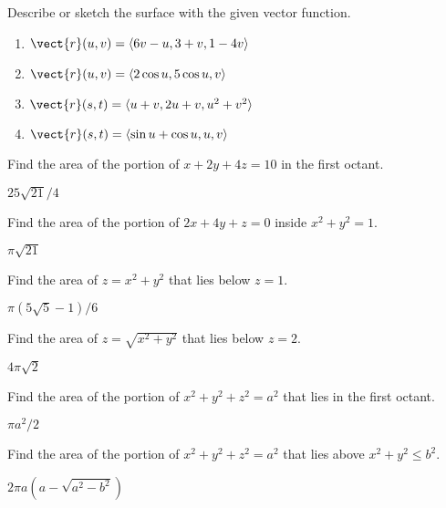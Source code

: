 \begin{enumialphparenastyle}

\begin{ex} \label{exfix3}
Describe or sketch the surface with the given vector function.
\begin{enumerate}
  \item	$\vect{r}(u,v) = \langle 6v-u,3+v,1-4v \rangle$
  \item	$\vect{r}(u,v) = \langle 2\cos u, 5\cos u, v \rangle$ 
  \item	$\vect{r}(s,t) = \langle u+v,2u+v,u^2+v^2\rangle$
  \item	$\vect{r}(s,t) = \langle \sin u + \cos u, u, v \rangle$
\end{enumerate}
\end{ex}

\begin{ex}
Find the area of the portion of $x+2y+4z=10$ in the first octant.
\begin{sol}
	$25\sqrt{21}/4$
\end{sol}
\end{ex}

\begin{ex}
Find the area of the portion of $2x+4y+z=0$ inside $x^2+y^2=1$.
\begin{sol}
	$\pi\sqrt{21}$
\end{sol}
\end{ex}

\begin{ex}
Find the area of $z=x^2+y^2$ that lies below $z=1$.
\begin{sol}
	$\pi(5\sqrt5-1)/6$
\end{sol}
\end{ex}

\begin{ex}
Find the area of $z=\sqrt{x^2+y^2}$ that lies below $z=2$.
\begin{sol}
	$4\pi\sqrt2$
\end{sol}
\end{ex}

\begin{ex}
Find the area of the portion of $x^2+y^2+z^2=a^2$ that lies
in the first octant.
\begin{sol}
	$\pi a^2/2$
\end{sol}
\end{ex}

\begin{ex}
Find the area of the portion of $x^2+y^2+z^2=a^2$ that lies
above $x^2+y^2\le b^2$.
\begin{sol}
	$2\pi a(a-\sqrt{a^2-b^2})$
\end{sol}
\end{ex}


\end{enumialphparenastyle}
